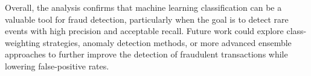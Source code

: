 Overall, the analysis confirms that machine learning classification can be a valuable tool for fraud detection, particularly when the goal is to detect rare events with high precision and acceptable recall. Future work could explore class-weighting strategies, anomaly detection methods, or more advanced ensemble approaches to further improve the detection of fraudulent transactions while lowering false-positive rates.
